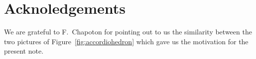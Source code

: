 \documentclass{amsart}
\theoremstyle{definition}
\newcommand{\fref}[1]{Figure~\ref{#1}} %
\begin{document}

\section*{Acknoledgements}

We are grateful to F.~Chapoton for pointing out to us the similarity between the two pictures of \fref{fig:accordiohedron} which gave us the motivation for the present note.




\label{sec:biblio}
\end{document}
